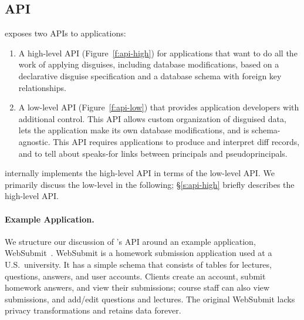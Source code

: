 \subsection{API}
\label{s:api}



\noindent
\sys exposes two APIs to applications:
%
\begin{enumerate}[nosep]
 \item A high-level API (Figure~\ref{f:api-high}) for applications that want \sys to do
   all the work of applying disguises, including database modifications, based on
   a declarative disguise specification and a database schema with foreign key
   relationships.
 \item A low-level API (Figure~\ref{f:api-low}) that provides application developers with
   additional control. This API allows custom organization of disguised data, lets the application
   make its own database modifications, and is schema-agnostic. This API requires applications
   to produce and interpret diff records, and to tell \sys about speaks-for links between
   principals and pseudoprincipals.
\end{enumerate}
%
\sys internally implements the high-level API in terms of the low-level API.
%
We primarily discuss the low-level in the following; \S\ref{s:api-high}
briefly describes the high-level API.
%

%

%
\paragraph{Example Application.}
%
We structure our discussion of \sys's API around an example application,
WebSubmit~\cite{websubmit-rs-anon}.
%
WebSubmit is a homework submission application used at a U.S.\ university.
%
It has a simple schema that consists of tables for lectures, questions, answers, and
user accounts.
%
Clients create an account, submit homework answers, and view their submissions;
course staff can also view submissions, and add/edit questions and lectures.
%
The original WebSubmit lacks privacy transformations and retains data forever.
%


